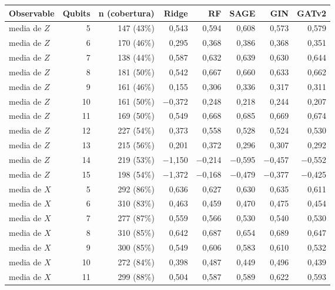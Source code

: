 \begin{table}[htbp]
    \centering
    {\footnotesize
    \begin{tabular}{@{}lrrrrrrr@{}}
        \toprule
        \textbf{Observable} & \textbf{Qubits} & \textbf{n (cobertura)} & \textbf{Ridge} & \textbf{RF} & \textbf{SAGE} & \textbf{GIN} & \textbf{GATv2} \\
        \midrule
        media de $Z$ & 5 & 147 (43\%) & 0,543 & 0,594 & 0,608 & 0,573 & 0,579 \\
        media de $Z$ & 6 & 170 (46\%) & 0,295 & 0,368 & 0,386 & 0,368 & 0,351 \\
        media de $Z$ & 7 & 138 (44\%) & 0,587 & 0,632 & 0,639 & 0,630 & 0,644 \\
        media de $Z$ & 8 & 181 (50\%) & 0,542 & 0,667 & 0,660 & 0,633 & 0,662 \\
        media de $Z$ & 9 & 161 (46\%) & 0,155 & 0,306 & 0,336 & 0,317 & 0,311 \\
        media de $Z$ & 10 & 161 (50\%) & $-$0,372 & 0,248 & 0,218 & 0,244 & 0,207 \\
        media de $Z$ & 11 & 169 (50\%) & 0,549 & 0,668 & 0,685 & 0,669 & 0,674 \\
        media de $Z$ & 12 & 227 (54\%) & 0,373 & 0,558 & 0,528 & 0,524 & 0,530 \\
        media de $Z$ & 13 & 215 (56\%) & 0,201 & 0,372 & 0,296 & 0,307 & 0,292 \\
        media de $Z$ & 14 & 219 (53\%) & $-$1,150 & $-$0,214 & $-$0,595 & $-$0,457 & $-$0,552 \\
        media de $Z$ & 15 & 198 (54\%) & $-$1,372 & $-$0,168 & $-$0,479 & $-$0,377 & $-$0,425 \\
        media de $X$ & 5 & 292 (86\%) & 0,636 & 0,627 & 0,630 & 0,635 & 0,611 \\
        media de $X$ & 6 & 310 (83\%) & 0,463 & 0,459 & 0,470 & 0,475 & 0,454 \\
        media de $X$ & 7 & 277 (87\%) & 0,559 & 0,566 & 0,530 & 0,540 & 0,530 \\
        media de $X$ & 8 & 310 (85\%) & 0,642 & 0,687 & 0,654 & 0,689 & 0,647 \\
        media de $X$ & 9 & 300 (85\%) & 0,549 & 0,606 & 0,583 & 0,610 & 0,532 \\
        media de $X$ & 10 & 272 (84\%) & 0,398 & 0,487 & 0,449 & 0,496 & 0,439 \\
        media de $X$ & 11 & 299 (88\%) & 0,504 & 0,587 & 0,589 & 0,622 & 0,593 \\

\end{tabular}}
\end{table}
